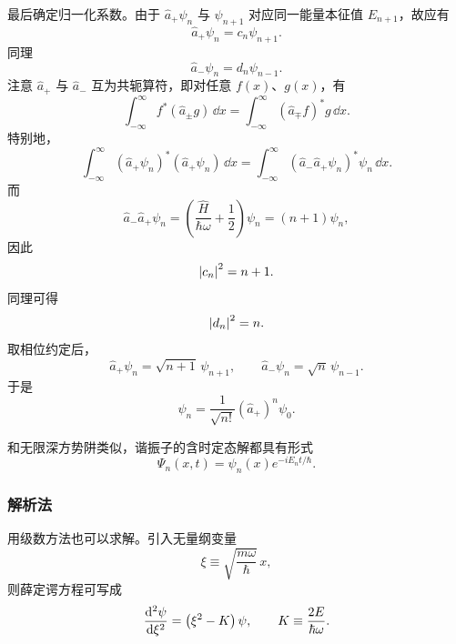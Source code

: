 最后确定归一化系数。由于 \(\hat{a}_+\psi_n\) 与 \(\psi_{n+1}\) 对应同一能量本征值 \(E_{n+1}\)，故应有
\begin{equation}
    \hat{a}_+\psi_n=c_n\psi_{n+1}.
\end{equation}
同理
\begin{equation}
    \hat{a}_-\psi_n=d_n\psi_{n-1}.
\end{equation}
注意 \(\hat{a}_+\) 与 \(\hat{a}_-\) 互为共轭算符，即对任意 \(f(x)\)、\(g(x)\)，有
\begin{equation}
    \int_{-\infty}^{\infty} f^*\left( \hat{a}_\pm g \right)\,\dd x
    =
    \int_{-\infty}^{\infty} \left( \hat{a}_\mp f \right)^*g\,\dd x.
\end{equation}
特别地，
\begin{equation}
    \int_{-\infty}^{\infty}\left( \hat{a}_+\psi_n \right)^*\left( \hat{a}_+\psi_n \right)\,\dd x
    =
    \int_{-\infty}^{\infty}\left( \hat{a}_-\hat{a}_+\psi_n \right)^*\psi_n\,\dd x.
\end{equation}
而
\begin{equation}
    \hat{a}_-\hat{a}_+\psi_n
    =
    \left( \frac{\hat{H}}{\hbar\omega}+\frac{1}{2} \right)\psi_n
    =
    \left( n+1 \right)\psi_n,
\end{equation}
因此
\begin{equation}
    \abs{c_n}^2=n+1.
\end{equation}
同理可得
\begin{equation}
    \abs{d_n}^2=n.
\end{equation}
取相位约定后，
\begin{equation}
    \hat{a}_+\psi_n=\sqrt{n+1}\,\psi_{n+1},
    \qquad
    \hat{a}_-\psi_n=\sqrt{n}\,\psi_{n-1}.
\end{equation}
于是
\begin{equation}
    \psi_n=\frac{1}{\sqrt{n!}}\left( \hat{a}_+ \right)^n\psi_0.
\end{equation}

和无限深方势阱类似，谐振子的含时定态解都具有形式
\begin{equation}
    \Psi_n(x,t)=\psi_n(x)e^{-iE_nt/\hbar}.
\end{equation}

\subsubsection{解析法}

用级数方法也可以求解。引入无量纲变量
\begin{equation}
    \xi\equiv \sqrt{\frac{m\omega}{\hbar}}\,x,
\end{equation}
则薛定谔方程可写成
\begin{equation}
    \dv[2]{\psi}{\xi}=\left( \xi^2-K \right)\psi,
    \qquad
    K\equiv \frac{2E}{\hbar\omega}.
\end{equation}

